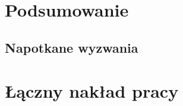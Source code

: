 
\chapter{Podsumowanie}
\label{ch:podsumowanie}

\section{Napotkane wyzwania }
\label{sec:napotkane-wyzwania}


\chapter{Łączny nakład pracy}
\label{sec:laczny-naklad-pracy}





